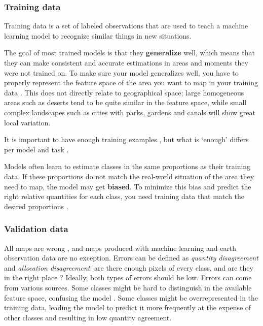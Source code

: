     \subsubsection{Training data}

        Training data is a set of labeled observations that are used to teach a machine learning model to recognize similar things in new situations. 
        
        The goal of most trained models is that they \textbf{generalize} well, which means that they can make consistent and accurate estimations in areas and moments they were not trained on. To make sure your model generalizes well, you have to properly represent the feature space of the area you want to map in your training data \citep{meyer2021predicting}. This does not directly relate to geographical space; large homogeneous areas such as deserts tend to be quite similar in the feature space, while small complex landscapes such as cities with parks, gardens and canals will show great local variation. 

        It is important to have enough training examples \citep{ramezan2021effects,rodriguez-perez2017influence,zhu2016optimizing}, but what is `enough' differs per model \citep{myburgh2014impact} and task \citep{koshute2021recommending}.
        
        Models often learn to estimate classes in the same proportions as their training data. If these proportions do not match the real-world situation of the area they need to map, the model may get \textbf{biased}. To minimize this bias and predict the right relative quantities for each class, you need training data that match the desired proportions \citep{he2009learning, kleinewillinghofer2022unbiased}.
        
    \subsubsection{Validation data}

        All maps are wrong \citep{monmonier2018how}, and maps produced with machine learning and earth observation data are no exception. Errors can be defined as \textit{quantity disagreement} and \textit{allocation disagreement}: are there enough pixels of every class, and are they in the right place \citep{pontius2006can,pontius2011death}? Ideally, both types of errors should be low. Errors can come from various sources. Some classes might be hard to distinguish in the available feature space, confusing the model \citep{shivakumar2017spectral}. Some classes might be overrepresented in the training data, leading the model to predict it more frequently at the expense of other classes and resulting in low quantity agreement.

